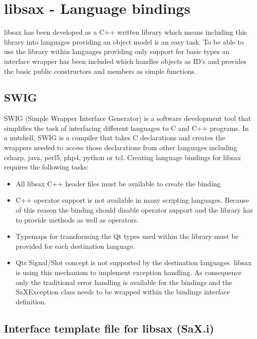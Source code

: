 \chapter{libsax - Language bindings}
\minitoc

libsax has been developed as a C++ written library which means
including this library into languages providing an object model
is an easy task. To be able to use the library within languages
providing only support for basic types an interface wrapper has
been included which handles objects as ID's and provides the basic
public constructors and members as simple functions.

\section{SWIG}

SWIG (Simple Wrapper Interface Generator) is a software development tool
that simplifies the task of
interfacing different languages to C and C++ programs. In a nutshell,
SWIG is a compiler that takes C declarations and creates the wrappers
needed to access those declarations from other languages
including csharp, java, perl5, php4, python or tcl. Creating language
bindings for libsax requires the following tasks:

\begin{itemize}
\item All libsax C++ header files must be available to create the binding
\item C++ operator support is not available in many scripting languages.
      Because of this reason the binding should disable operator support
      and the library has to provide methods as well as operators.
\item Typemaps for transforming the Qt types used within the library
      must be provided for each destination language.
\item Qts Signal/Slot concept is not supported by the destination languages.
      libsax is using this mechanism to implement exception handling.
      As consequence only the traditional error handling is available for
      the bindings and the SaXException class needs to be wrapped within
	  the bindings interface definition.
\end{itemize}

\newpage

\section{Interface template file for libsax (SaX.i)}

